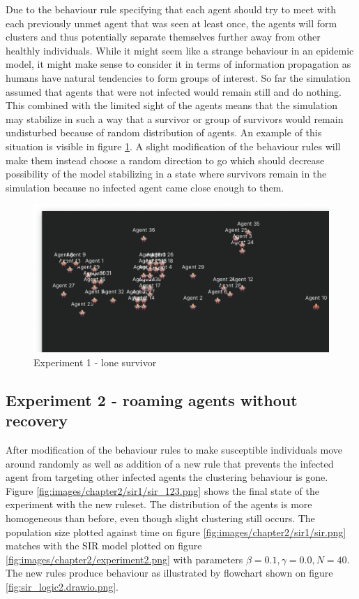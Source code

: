 Due to the behaviour rule specifying that each agent should try to meet with each previously unmet agent that was seen at least once, the agents will form clusters and thus potentially separate themselves further away from other healthly individuals.
While it might seem like a strange behaviour in an epidemic model, it might make sense to consider it in terms of information propagation as humans have natural tendencies to form groups of interest.
So far the simulation assumed that agents that were not infected would remain still and do nothing.
This combined with the limited sight of the agents means that the simulation may stabilize in such a way that a survivor or group of survivors would remain undisturbed because of random distribution of agents.
An example of this situation is visible in figure \ref{fig:images/chapter2/sir0/sir_255.png}.
A slight modification of the behaviour rules will make them instead choose a random direction to go which should decrease possibility of the model stabilizing in a state where survivors remain in the simulation because no infected agent came close enough to them.

\begin{figure}[H]
    \centering
    \includegraphics[width=1.0\textwidth]{images/chapter2/sir0/sir_255.png}
    \caption{Experiment 1 - lone survivor}\label{fig:images/chapter2/sir0/sir_255.png}
\end{figure}

\subsection{Experiment 2 - roaming agents without recovery}

After modification of the behaviour rules to make susceptible individuals move around randomly as well as addition of a new rule that prevents the infected agent from targeting other infected agents the clustering behaviour is gone.
Figure \ref{fig:images/chapter2/sir1/sir_123.png} shows the final state of the experiment with the new ruleset.
The distribution of the agents is more homogeneous than before, even though slight clustering still occurs.
The population size plotted against time on figure \ref{fig:images/chapter2/sir1/sir.png} matches with the SIR model plotted on figure \ref{fig:images/chapter2/experiment2.png} with parameters $\beta = 0.1, \gamma = 0.0, N = 40$.
The new rules produce behaviour as illustrated by flowchart shown on figure \ref{fig:sir_logic2.drawio.png}.

